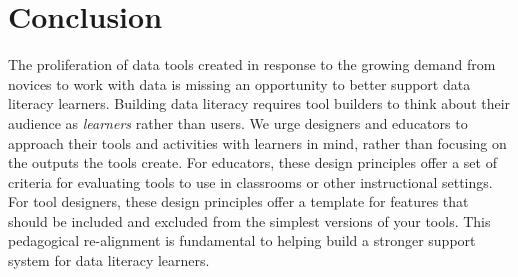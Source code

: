 \documentclass{acm_proc_article-sp}
\begin{document}
\section{Conclusion}

The proliferation of data tools created in response to the growing demand from novices to work with data is missing an opportunity to better support data literacy learners.  Building data literacy requires tool builders to think about their audience as \emph{learners} rather than users. We urge designers and educators to approach their tools and activities with learners in mind, rather than focusing on the outputs the tools create. For educators, these design principles offer a set of criteria for evaluating tools to use in classrooms or other instructional settings. For tool designers, these design principles offer a template for features that should be included and excluded from the simplest versions of your tools. This pedagogical re-alignment is fundamental to helping build a stronger support system for data literacy learners.




\end{document}
